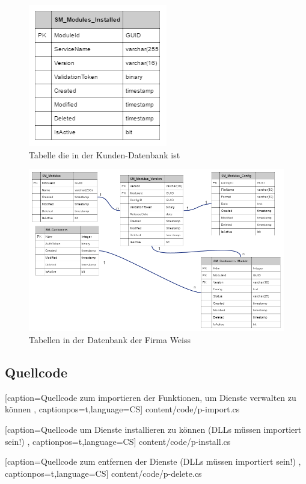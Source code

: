 \begin{center}
    \begin{figure}[H]
        \centering
        \includegraphics[scale=0.4]{content/attachments/d-table-cus.png}
        \caption{Tabelle die in der Kunden-Datenbank ist}
        \label{fig:d-table-cus}
    \end{figure}
    
    \begin{figure}[H]
        \centering
        \includegraphics[scale=0.4]{content/attachments/d-table-wss.png}
        \caption{Tabellen in der Datenbank der Firma Weiss}
        \label{fig:d-table-wsss}
    \end{figure}
\end{center}

\subsection{Quellcode}
\label{app:sourceCode}

\begin{center}
 
    [caption={Quellcode zum importieren der Funktionen, um Dienste verwalten zu können}
       \label{lst:import-cs},
       captionpos=t,language=CS]
 {content/code/p-import.cs}
 
 
    [caption={Quellcode um Dienste installieren zu können (DLLs müssen importiert sein!)}
       \label{lst:install-cs},
       captionpos=t,language=CS]
 {content/code/p-install.cs}
 
 
    [caption={Quellcode zum entfernen der Dienste (DLLs müssen importiert sein!)}
       \label{lst:delete-cs},
       captionpos=t,language=CS]
 {content/code/p-delete.cs}
\end{center}